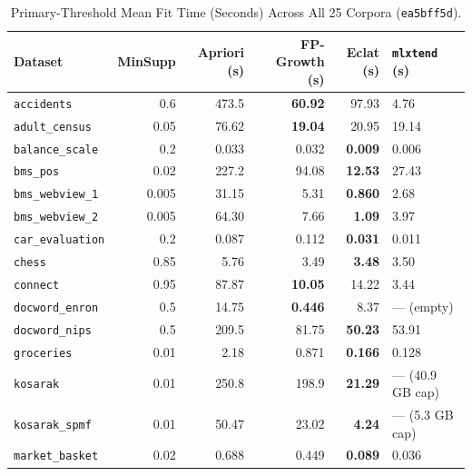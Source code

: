 \begin{table}[ht!]
\centering
\caption{Primary-Threshold Mean Fit Time (Seconds) Across All 25 Corpora (\texttt{ea5bff5d}).}
\label{tab:appI_summary}
\fontsize{9}{11.2}\selectfont
\renewcommand{\arraystretch}{0.95}
\begin{tabular*}{\textwidth}{@{\extracolsep{\fill}}lrrrrl@{}}
\toprule
\textbf{\color{KLDarkBlue} Dataset} & \textbf{\color{KLDarkBlue} MinSupp} & \textbf{\color{KLDarkBlue} Apriori (s)} & \textbf{\color{KLDarkBlue} FP-Growth (s)} & \textbf{\color{KLDarkBlue} Eclat (s)} & \textbf{\color{KLDarkBlue} \texttt{mlxtend} (s)} \\
\midrule
\texttt{accidents} & 0.6 & 473.5 & \textbf{60.92} & 97.93 & 4.76 \\
\texttt{adult\_\protect\allowbreak{}census} & 0.05 & 76.62 & \textbf{19.04} & 20.95 & 19.14 \\
\texttt{balance\_\protect\allowbreak{}scale} & 0.2 & 0.033 & 0.032 & \textbf{0.009} & 0.006 \\
\texttt{bms\_\protect\allowbreak{}pos} & 0.02 & 227.2 & 94.08 & \textbf{12.53} & 27.43 \\
\texttt{bms\_\protect\allowbreak{}webview\_\protect\allowbreak{}1} & 0.005 & 31.15 & 5.31 & \textbf{0.860} & 2.68 \\
\texttt{bms\_\protect\allowbreak{}webview\_\protect\allowbreak{}2} & 0.005 & 64.30 & 7.66 & \textbf{1.09} & 3.97 \\
\texttt{car\_\protect\allowbreak{}evaluation} & 0.2 & 0.087 & 0.112 & \textbf{0.031} & 0.011 \\
\texttt{chess} & 0.85 & 5.76 & 3.49 & \textbf{3.48} & 3.50 \\
\texttt{connect} & 0.95 & 87.87 & \textbf{10.05} & 14.22 & 3.44 \\
\texttt{docword\_\protect\allowbreak{}enron} & 0.5 & 14.75 & \textbf{0.446} & 8.37 & --- (empty) \\
\texttt{docword\_\protect\allowbreak{}nips} & 0.5 & 209.5 & 81.75 & \textbf{50.23} & 53.91 \\
\texttt{groceries} & 0.01 & 2.18 & 0.871 & \textbf{0.166} & 0.128 \\
\texttt{kosarak} & 0.01 & 250.8 & 198.9 & \textbf{21.29} & --- (40.9 GB cap) \\
\texttt{kosarak\_\protect\allowbreak{}spmf} & 0.01 & 50.47 & 23.02 & \textbf{4.24} & --- (5.3 GB cap) \\
\texttt{market\_\protect\allowbreak{}basket} & 0.02 & 0.688 & 0.449 & \textbf{0.089} & 0.036 \\

\end{tabular*}
\end{table}
